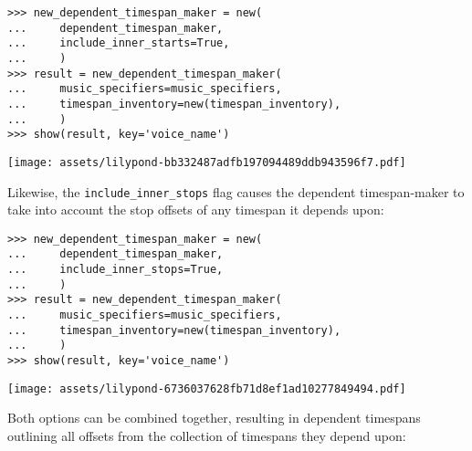 \begin{abjadbookoutput}
\begin{singlespacing}
\vspace{-0.5\baselineskip}
\begin{verbatim}
>>> new_dependent_timespan_maker = new(
...     dependent_timespan_maker,
...     include_inner_starts=True,
...     )
>>> result = new_dependent_timespan_maker(
...     music_specifiers=music_specifiers,
...     timespan_inventory=new(timespan_inventory),
...     )
>>> show(result, key='voice_name')
\end{verbatim}
\noindent\texttt{[image: assets/lilypond-bb332487adfb197094489ddb943596f7.pdf]}
\end{singlespacing}
\end{abjadbookoutput}

\noindent Likewise, the \texttt{include\_inner\_stops} flag causes the
dependent timespan-maker to take into account the stop offsets of any timespan
it depends upon:

\begin{comment}
<abjad>
new_dependent_timespan_maker = new(
    dependent_timespan_maker,
    include_inner_stops=True,
    )
result = new_dependent_timespan_maker(
    music_specifiers=music_specifiers,
    timespan_inventory=new(timespan_inventory),
    )
show(result, key='voice_name')
</abjad>
\end{comment}

\begin{abjadbookoutput}
\begin{singlespacing}
\vspace{-0.5\baselineskip}
\begin{verbatim}
>>> new_dependent_timespan_maker = new(
...     dependent_timespan_maker,
...     include_inner_stops=True,
...     )
>>> result = new_dependent_timespan_maker(
...     music_specifiers=music_specifiers,
...     timespan_inventory=new(timespan_inventory),
...     )
>>> show(result, key='voice_name')
\end{verbatim}
\noindent\texttt{[image: assets/lilypond-6736037628fb71d8ef1ad10277849494.pdf]}
\end{singlespacing}
\end{abjadbookoutput}

\noindent Both options can be combined together, resulting in dependent
timespans outlining all offsets from the collection of timespans they depend
upon:

\begin{comment}
<abjad>
new_dependent_timespan_maker = new(
    dependent_timespan_maker,
    include_inner_starts=True,
    include_inner_stops=True,
    )
result = new_dependent_timespan_maker(
    music_specifiers=music_specifiers,
    timespan_inventory=new(timespan_inventory),
    )
show(result, key='voice_name')
</abjad>
\end{comment}

